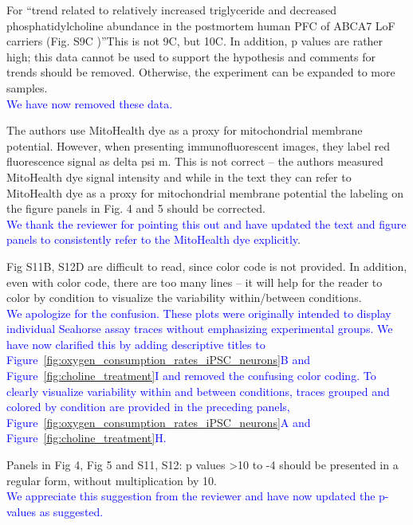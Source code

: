 For “trend related to relatively increased triglyceride and decreased phosphatidylcholine abundance in the postmortem human PFC of ABCA7 LoF carriers (Fig. S9C )”This is not 9C, but 10C. In addition, p values are rather high; this data cannot be used to support the hypothesis and comments for trends should be removed. Otherwise, the experiment can be expanded to more samples.\\
\textcolor{blue}{We have now removed these data.}

The authors use MitoHealth dye as a proxy for mitochondrial membrane potential. However, when presenting immunofluorescent images, they label red fluorescence signal as delta psi m. This is not correct – the authors measured MitoHealth dye signal intensity and while in the text they can refer to MitoHealth dye as a proxy for mitochondrial membrane potential the labeling on the figure panels in Fig. 4 and 5 should be corrected.\\
\textcolor{blue}{We thank the reviewer for pointing this out and have updated the text and figure panels to consistently refer to the MitoHealth dye explicitly}.

Fig S11B, S12D are difficult to read, since color code is not provided. In addition, even with color code, there are too many lines – it will help for the reader to color by condition to visualize the variability within/between conditions.\\
\textcolor{blue}{We apologize for the confusion. These plots were originally intended to display individual Seahorse assay traces without emphasizing experimental groups. We have now clarified this by adding descriptive titles to Figure~\ref{fig:oxygen_consumption_rates_iPSC_neurons}B and Figure~\ref{fig:choline_treatment}I and removed the confusing color coding. To clearly visualize variability within and between conditions, traces grouped and colored by condition are provided in the preceding panels, Figure~\ref{fig:oxygen_consumption_rates_iPSC_neurons}A and Figure~\ref{fig:choline_treatment}H.}

Panels in Fig 4, Fig 5 and S11, S12: p values >10 to -4 should be presented in a regular form, without multiplication by 10.\\
\textcolor{blue}{We appreciate this suggestion from the reviewer and have now updated the p-values as suggested.}
